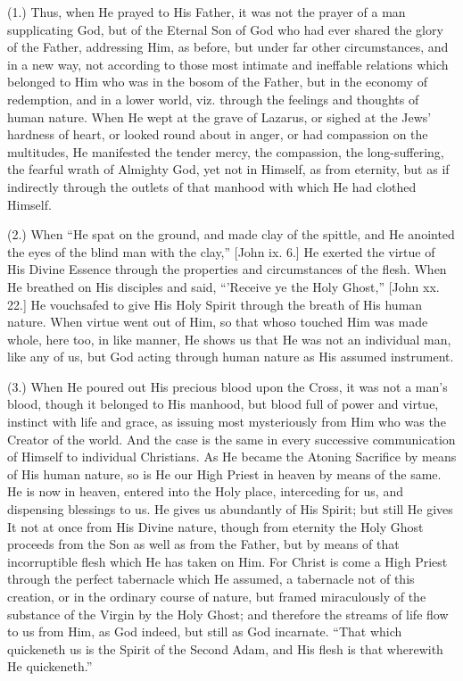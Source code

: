 (1.) Thus, when He prayed to His Father, it was not the prayer of a
man supplicating God, but of the Eternal Son of God who had ever shared
the glory of the Father, addressing Him, as before, but under far other
circumstances, and in a new way, not according to those most intimate
and ineffable relations which belonged to Him who was in the bosom of
the Father, but in the economy of redemption, and in a lower world, viz.
through the feelings and thoughts of human nature. When He wept at the
grave of Lazarus, or sighed at the Jews' hardness of heart, or looked
round about in anger, or had compassion on the multitudes, He manifested
the tender mercy, the compassion, the long-suffering, the fearful wrath
of Almighty God, yet not in Himself, as from eternity, but as if
indirectly through the outlets of that manhood with which He had clothed
Himself.

(2.) When ``He spat on the ground, and made clay of the spittle,
and He anointed the eyes of the blind man with the clay,'' [John ix.
6.] He exerted the virtue of His Divine Essence through the properties
and circumstances of the flesh. When He breathed on His disciples and
said, ``'Receive ye the Holy Ghost,'' [John xx. 22.] He
vouchsafed to give His Holy Spirit through the breath of His human
nature. When virtue went out of Him, so that whoso touched Him was made
whole, here too, in like manner, He shows us that He was not an
individual man, like any of us, but God acting through human nature as
His assumed instrument.

(3.) When He poured out His precious blood upon the Cross, it was not
a man's blood, though it belonged to His manhood, but blood full of
power and virtue, instinct with life and grace, as issuing most
mysteriously from Him who was the Creator of the world. And the case is
the same in every successive communication of Himself to individual
Christians. As He became the Atoning Sacrifice by means of His human
nature, so is He our High Priest in heaven by means of the same. He is
now in heaven, entered into the Holy place, interceding for us, and
dispensing blessings to us. He gives us abundantly of His Spirit; but
still He gives It not at once from His Divine nature, though from
eternity the Holy Ghost proceeds from the Son as well as from the
Father, but by means of that incorruptible flesh which He has taken on
Him. For Christ is come a High Priest through the perfect tabernacle
which He assumed, a tabernacle not of this creation, or in the ordinary
course of nature, but framed miraculously of the substance of the Virgin
by the Holy Ghost; and therefore the streams of life flow to us from
Him, as God indeed, but still as God incarnate. ``That which
quickeneth us is the Spirit of the Second Adam, and His flesh is that
wherewith He quickeneth.''

